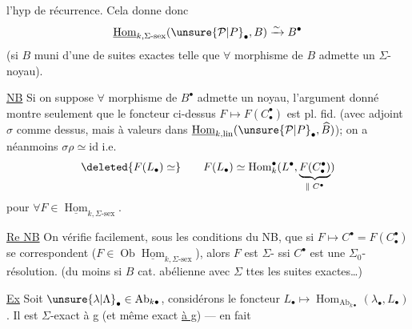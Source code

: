 l'hyp de récurrence. Cela donne donc
\[
\underline{\operatorname{Hom}}_{k,\Sigma\text{-sex}}(\unsure{\mathcal P|P}_\bullet,B)\xrightarrow{\sim}B^\bullet
\]
(si $B$ muni d'une  de suites exactes
telle que $\forall$ morphisme de $B$ admette
un $\Sigma$-noyau).

\uline{NB} Si on  suppose  
$\forall$ morphisme de $B^\bullet$ admette un noyau,
l'argument donné montre seulement que
le foncteur ci-dessus $F\longmapsto F(C_\bullet^\bullet)$
est pl. fid. (avec adjoint $\sigma$ comme dessus,
mais à valeurs dans $\underline{\operatorname{Hom}}_{k,\mathrm{lin}}(\unsure{\mathcal P|P}_\bullet,\widehat B)$);
on a néanmoins $\sigma\rho\simeq\mathrm{id}$ i.e.
\[
\deleted{F(L_\bullet)\simeq}\qquad
F(L_\bullet)\simeq\operatorname{Hom}_k^\bullet(L^\bullet,\underbrace{F(C_\bullet^\bullet)}_{\Vert\;C^\bullet})
\]
pour $\forall F\in\underline{\operatorname{Hom}}_{k,\Sigma\text{-sex}}$.

\uline{Re NB} On  vérifie facilement, sous les
conditions du NB, que si $F\longmapsto C^\bullet=F(C_\bullet^\bullet)$
se correspondent ($F\in\operatorname{Ob}\underline{\operatorname{Hom}}_{k,\Sigma\text{-sex}}$), alors
$F$ est $\Sigma$- ssi $C^\bullet$ est une $\Sigma_0$-résolution.
(du moins si $B$ cat. abélienne avec $\Sigma$ ttes
les suites exactes\ldots)

\uline{Ex} Soit $\unsure{\lambda|\Lambda}_\bullet\in\mathrm{Ab}_{k\bullet}$, considérons
le foncteur $L_\bullet\longmapsto\operatorname{Hom}_{\mathrm{Ab}_{k\bullet}}(\lambda_\bullet,L_\bullet)$.
Il est $\Sigma$-exact à g (et même exact \uline{à g}) --- en fait


